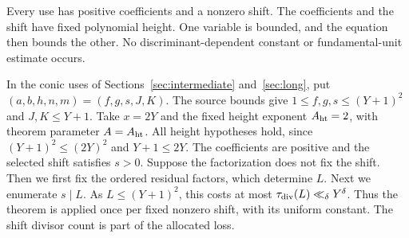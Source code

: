 \begin{remark}
Every use has positive coefficients and a nonzero shift. The
coefficients and the shift have fixed polynomial height. One variable is
bounded, and the equation then bounds the other. No
discriminant-dependent constant or fundamental-unit estimate occurs.
\end{remark}

In the conic uses of Sections~\ref{sec:intermediate} and~\ref{sec:long},
put $(a,b,h,n,m)=(f,g,s,J,K)$. The source bounds give
$1\le f,g,s\le (Y+1)^2$ and $J,K\le Y+1$. Take $x=2Y$ and the fixed
height exponent $A_{\rm ht}=2$, with theorem parameter $A=A_{\rm ht}$. All
height hypotheses hold, since $(Y+1)^2\le(2Y)^2$ and $Y+1\le2Y$.
The coefficients are positive and the selected shift satisfies $s>0$.
Suppose the factorization does not fix the shift. Then we first fix
the ordered residual factors, which determine $L$. Next we enumerate $s\mid L$.
As $L\le(Y+1)^2$, this costs at most $\tau_{\mathrm{div}}(L)\ll_\delta Y^\delta$.
Thus the theorem is applied once per fixed nonzero shift, with its uniform
constant. The shift divisor count is part of the allocated loss.
